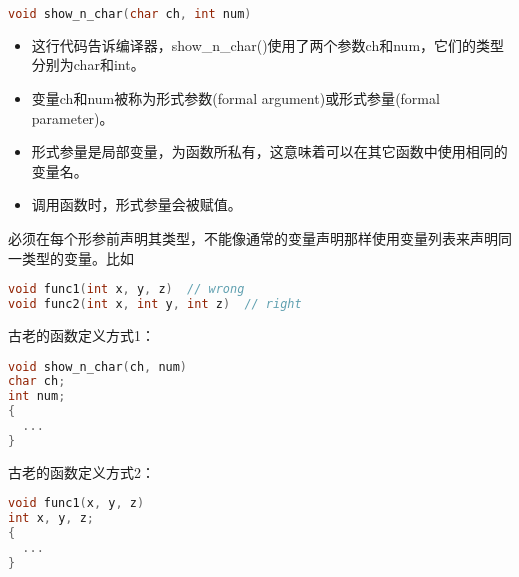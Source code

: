 \begin{frame}[fragile]
\begin{lstlisting}[language=c,backgroundcolor=\color{red!10},title=函数头]
  void show_n_char(char ch, int num)
\end{lstlisting}
\begin{itemize}
\item
这行代码告诉编译器，{\tf show\_n\_char()}使用了两个参数{\tf ch}和{\tf num}，它们的类型分别为{\tf char}和{\tf int}。\\[0.1in]
\item
变量{\tf ch}和{\tf num}被称为形式参数{\tf (formal argument)}或形式参量{\tf (formal parameter)}。\\[0.1in]
\item 形式参量是局部变量，为函数所私有，这意味着可以在其它函数中使用相同的变量名。\\[0.1in]
\item 调用函数时，形式参量会被赋值。
\end{itemize}
\end{frame}

\begin{frame}[fragile]
必须在每个形参前声明其类型，不能像通常的变量声明那样使用变量列表来声明同一类型的变量。比如
\begin{lstlisting}[language=c,backgroundcolor=\color{red!10}]
void func1(int x, y, z)  // wrong 
void func2(int x, int y, int z)  // right
\end{lstlisting}

\end{frame}

\begin{frame}[fragile]
古老的函数定义方式1：
\begin{lstlisting}[language=c,backgroundcolor=\color{red!10}]
void show_n_char(ch, num)
char ch;
int num;
{
  ...
}
\end{lstlisting}
\end{frame}

\begin{frame}[fragile]
古老的函数定义方式2：
\begin{lstlisting}[language=c,backgroundcolor=\color{red!10}]
void func1(x, y, z)
int x, y, z;
{
  ... 
}
\end{lstlisting}
\end{frame}

